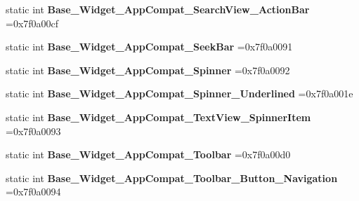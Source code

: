 \begin{DoxyCompactItemize}
static int {\bfseries Base\+\_\+\+Widget\+\_\+\+App\+Compat\+\_\+\+Search\+View\+\_\+\+Action\+Bar} =0x7f0a00cf
\item 
\mbox{\label{classandroid_1_1support_1_1graphics_1_1drawable_1_1animated_1_1R_1_1style_a27e6973dfed432c4e4ec8836c93e8f47}} 
static int {\bfseries Base\+\_\+\+Widget\+\_\+\+App\+Compat\+\_\+\+Seek\+Bar} =0x7f0a0091
\item 
\mbox{\label{classandroid_1_1support_1_1graphics_1_1drawable_1_1animated_1_1R_1_1style_a023213a3098ceb60f390f0a330048d3d}} 
static int {\bfseries Base\+\_\+\+Widget\+\_\+\+App\+Compat\+\_\+\+Spinner} =0x7f0a0092
\item 
\mbox{\label{classandroid_1_1support_1_1graphics_1_1drawable_1_1animated_1_1R_1_1style_a16fe567ba81b139b66c68a366c8703cb}} 
static int {\bfseries Base\+\_\+\+Widget\+\_\+\+App\+Compat\+\_\+\+Spinner\+\_\+\+Underlined} =0x7f0a001e
\item 
\mbox{\label{classandroid_1_1support_1_1graphics_1_1drawable_1_1animated_1_1R_1_1style_a6f6809e6d75660a7c77743e6bf940be4}} 
static int {\bfseries Base\+\_\+\+Widget\+\_\+\+App\+Compat\+\_\+\+Text\+View\+\_\+\+Spinner\+Item} =0x7f0a0093
\item 
\mbox{\label{classandroid_1_1support_1_1graphics_1_1drawable_1_1animated_1_1R_1_1style_a92fffd2c05ddcafe4820bc08c61f4f8c}} 
static int {\bfseries Base\+\_\+\+Widget\+\_\+\+App\+Compat\+\_\+\+Toolbar} =0x7f0a00d0
\item 
\mbox{\label{classandroid_1_1support_1_1graphics_1_1drawable_1_1animated_1_1R_1_1style_aea0d9010fa7f21d9de0e0a2e74bd34ee}} 
static int {\bfseries Base\+\_\+\+Widget\+\_\+\+App\+Compat\+\_\+\+Toolbar\+\_\+\+Button\+\_\+\+Navigation} =0x7f0a0094
\item 
\mbox{\label{classandroid_1_1support_1_1graphics_1_1drawable_1_1animated_1_1R_1_1style_a820c1ac9dbf97ead0fd5e629b6efd545}} 

\end{DoxyCompactItemize}
